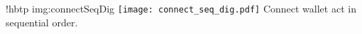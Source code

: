 \namedfigure
{!hbtp}
{img:connectSeqDig}
{\texttt{[image: connect\_seq\_dig.pdf]}}
{Connect wallet act in sequential order.}
